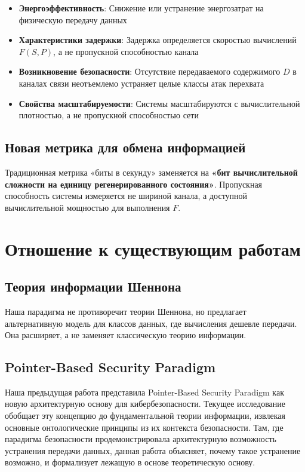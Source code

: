 \documentclass[11pt,a4paper]{article}
\begin{document}
\begin{itemize}
    \item \textbf{Энергоэффективность}: Снижение или устранение энергозатрат на физическую передачу данных
    \item \textbf{Характеристики задержки}: Задержка определяется скоростью вычислений $F(S, P)$, а не пропускной способностью канала
    \item \textbf{Возникновение безопасности}: Отсутствие передаваемого содержимого $D$ в каналах связи неотъемлемо устраняет целые классы атак перехвата
    \item \textbf{Свойства масштабируемости}: Системы масштабируются с вычислительной плотностью, а не пропускной способностью сети
\end{itemize}

\subsection{Новая метрика для обмена информацией}

Традиционная метрика «биты в секунду» заменяется на \textbf{«бит вычислительной сложности на единицу регенерированного состояния»}. Пропускная способность системы измеряется не шириной канала, а доступной вычислительной мощностью для выполнения $F$.

\section{Отношение к существующим работам}

\subsection{Теория информации Шеннона}

Наша парадигма не противоречит теории Шеннона, но предлагает альтернативную модель для классов данных, где вычисления дешевле передачи. Она расширяет, а не заменяет классическую теорию информации.

\subsection{Pointer-Based Security Paradigm}

Наша предыдущая работа \cite{suvorov2025pointer} представила Pointer-Based Security Paradigm как новую архитектурную основу для кибербезопасности. Текущее исследование обобщает эту концепцию до фундаментальной теории информации, извлекая основные онтологические принципы из их контекста безопасности. Там, где парадигма безопасности продемонстрировала архитектурную возможность устранения передачи данных, данная работа объясняет, почему такое устранение возможно, и формализует лежащую в основе теоретическую основу.
\end{document}
